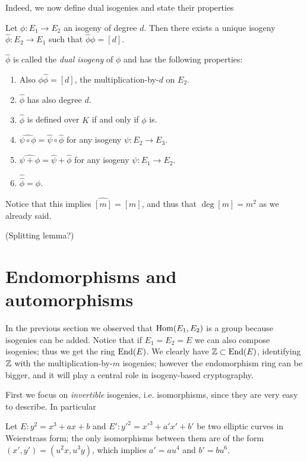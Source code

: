Indeed, we now define dual isogenies and state their properties

\begin{theorem}
    Let $\phi:E_1\to E_2$ an isogeny of degree $d$. Then there exists a unique isogeny $\hat\phi:E_2\to E_1$ such that $\hat\phi \phi=[d]$.
    
    $\hat\phi$ is called the \emph{dual isogeny} of $\phi$ and has the following properties:
    \begin{enumerate}
        \item Also $\phi\hat\phi=[d]$, the multiplication-by-$d$ on $E_2$.
        \item $\hat\phi$ has also degree $d$.
        \item $\hat\phi$ is defined over $K$ if and only if $\phi$ is.
        \item $\widehat{\psi\circ\phi}=\hat\psi\circ\hat\phi$ for any isogeny $\psi:E_2\to E_3$.
        \item $\widehat{\psi + \phi}=\hat\psi + \hat\phi$ for any isogeny $\psi:E_1\to E_2$.
        \item $\hat{\hat\phi}=\phi$.
    \end{enumerate}
\end{theorem}

Notice that this implies $\widehat{[m]}=[m]$, and thus that $\deg[m]=m^2$ as we already said.

(Splitting lemma?)

\section{Endomorphisms and automorphisms}

In the previous section we observed that $\operatorname{Hom}(E_1, E_2)$ is a group because isogenies can be added. Notice that if $E_1=E_2=E$ we can also compose isogenies; thus we get the ring $\operatorname{End}(E)$. We clearly have $\mathbb{Z}\subset\operatorname{End}(E)$, identifying $\mathbb{Z}$ with the multiplication-by-$m$ isogenies; however the endomorphism ring can be bigger, and it will play a central role in isogeny-based cryptography.

First we focus on \emph{invertible} isogenies, i.e. isomorphisms, since they are very easy to describe. In particular
\begin{proposition}
    Let $E:y^2=x^3+ax+b$ and $E':{y'}^2={x'}^3+a'x'+b'$ be two elliptic curves in Weierstrass form; the only isomorphisms between them are of the form $(x',y')=(u^2x, u^3y)$, which implies $a'=au^4$ and $b'=bu^6$.
\end{proposition}

